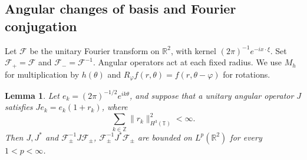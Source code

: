 \documentclass[11pt,a4paper,reqno,backref=page]{amsart}
\newcommand{\R}{\mathbb R}
\newcommand{\Z}{\mathbb Z}
\newcommand{\T}{\mathbb T}
\numberwithin{equation}{section}
\newtheorem{lemma}[theorem]{Lemma}
\theoremstyle{definition}
\theoremstyle{remark}
\begin{document}
\subsection{Angular changes of basis and Fourier conjugation}

Let $\mathcal F$ be the unitary Fourier transform on $\R^2$,
with kernel $(2\pi)^{-1}e^{-ix\cdot\xi}$. Set
$\mathcal F_+=\mathcal F$ and
$\mathcal F_-=\mathcal F^{-1}$. Angular operators act at each
fixed radius. We use $M_h$ for multiplication by $h(\theta)$
and $R_\varphi f(r,\theta)=f(r,\theta-\varphi)$ for rotations.

\begin{lemma}\label{lem:em-angular}
  Let $e_k=(2\pi)^{-1/2}e^{ik\theta}$, and suppose that a
  unitary angular operator $J$ satisfies
  $Je_k=e_k(1+r_k)$, where
  \begin{equation}\label{eq:em-summability}
    \sum_{k\in\Z}\|r_k\|_{H^3(\T)}^2<\infty.
  \end{equation}
  Then $J,J^*$ and
  $\mathcal F_\pm^{-1}J\mathcal F_\pm$,
  $\mathcal F_\pm^{-1}J^*\mathcal F_\pm$ are bounded on
  $L^p(\R^2)$ for every $1<p<\infty$.
\end{lemma}
\end{document}
